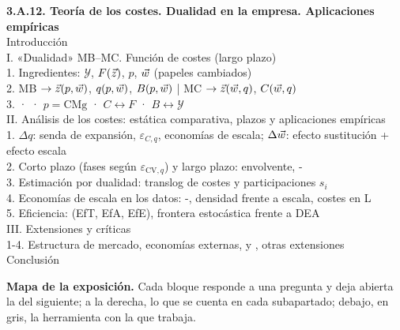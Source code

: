 \documentclass[11pt]{article}
\begin{document}
\begin{esquema}
\textbf{3.A.12. Teoría de los costes. Dualidad en la empresa. Aplicaciones empíricas}\\[2pt]
Introducción\\
I. «Dualidad» MB--MC. Función de costes (largo plazo)\\
\hspace*{1.5em}1. Ingredientes: $\mathcal{Y}$, $F(\vec{z})$, $p$, $\vec{w}$ (papeles cambiados)\\
\hspace*{1.5em}2. MB $\to\vec{z}(p,\vec{w})$, $q(p,\vec{w})$, $B(p,\vec{w})$ \;|\; MC $\to\vec{z}(\vec{w},q)$, $C(\vec{w},q)$\\
\hspace*{1.5em}3.  ·  · $p=\mathrm{CMg}$ · $C\leftrightarrow F$ · $B\leftrightarrow\mathcal{Y}$\\
II. Análisis de los costes: estática comparativa, plazos y aplicaciones empíricas\\
\hspace*{1.5em}1. $\Delta q$: senda de expansión, $\varepsilon_{C,q}$, economías de escala; $\Delta\vec{w}$: efecto sustitución + efecto escala\\
\hspace*{1.5em}2. Corto plazo (fases según $\varepsilon_{\mathrm{CV},q}$) y largo plazo: envolvente, -\\
\hspace*{1.5em}3. Estimación por dualidad: translog de costes y participaciones $s_i$\\
\hspace*{1.5em}4. Economías de escala en los datos: -, densidad frente a escala, costes en L\\
\hspace*{1.5em}5. Eficiencia:  (EfT, EfA, EfE), frontera estocástica frente a DEA\\
III. Extensiones y críticas\\
\hspace*{1.5em}1-4. Estructura de mercado, economías externas,  y , otras extensiones\\
Conclusión
\end{esquema}

\begin{anotaciones}
\textbf{Mapa de la exposición.} Cada bloque responde a una pregunta y deja abierta la del siguiente; a la derecha, lo que se cuenta en cada subapartado; debajo, en gris, la herramienta con la que trabaja.
\begin{infografiacaja}
\caption{Mapa del tema: la pregunta de cada bloque, sus subapartados y el hilo que los une}\label{figu:mapa-tema}
\end{infografiacaja}
\end{anotaciones}
\end{document}
